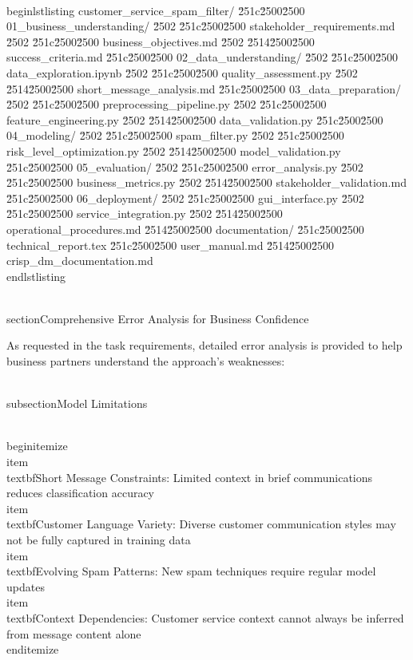 \documentclass[12pt,a4paper]{article}
\begin{document}
\\begin{lstlisting}
customer_service_spam_filter/
\u251c\u2500\u2500 01_business_understanding/
\u2502   \u251c\u2500\u2500 stakeholder_requirements.md
\u2502   \u251c\u2500\u2500 business_objectives.md
\u2502   \u2514\u2500\u2500 success_criteria.md
\u251c\u2500\u2500 02_data_understanding/
\u2502   \u251c\u2500\u2500 data_exploration.ipynb
\u2502   \u251c\u2500\u2500 quality_assessment.py
\u2502   \u2514\u2500\u2500 short_message_analysis.md
\u251c\u2500\u2500 03_data_preparation/
\u2502   \u251c\u2500\u2500 preprocessing_pipeline.py
\u2502   \u251c\u2500\u2500 feature_engineering.py
\u2502   \u2514\u2500\u2500 data_validation.py
\u251c\u2500\u2500 04_modeling/
\u2502   \u251c\u2500\u2500 spam_filter.py
\u2502   \u251c\u2500\u2500 risk_level_optimization.py
\u2502   \u2514\u2500\u2500 model_validation.py
\u251c\u2500\u2500 05_evaluation/
\u2502   \u251c\u2500\u2500 error_analysis.py
\u2502   \u251c\u2500\u2500 business_metrics.py
\u2502   \u2514\u2500\u2500 stakeholder_validation.md
\u251c\u2500\u2500 06_deployment/
\u2502   \u251c\u2500\u2500 gui_interface.py
\u2502   \u251c\u2500\u2500 service_integration.py
\u2502   \u2514\u2500\u2500 operational_procedures.md
\u2514\u2500\u2500 documentation/
    \u251c\u2500\u2500 technical_report.tex
    \u251c\u2500\u2500 user_manual.md
    \u2514\u2500\u2500 crisp_dm_documentation.md
\\end{lstlisting}

\\section{Comprehensive Error Analysis for Business Confidence}

As requested in the task requirements, detailed error analysis is provided to help business partners understand the approach's weaknesses:

\\subsection{Model Limitations}

\\begin{itemize}
    \\item \\textbf{Short Message Constraints}: Limited context in brief communications reduces classification accuracy
    \\item \\textbf{Customer Language Variety}: Diverse customer communication styles may not be fully captured in training data
    \\item \\textbf{Evolving Spam Patterns}: New spam techniques require regular model updates
    \\item \\textbf{Context Dependencies}: Customer service context cannot always be inferred from message content alone
\\end{itemize}
\end{document}
